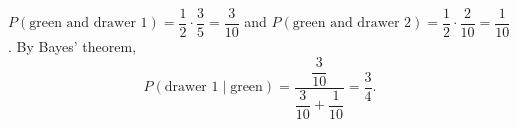 $P(\text{green and drawer 1})=\dfrac12\cdot\dfrac35=\dfrac3{10}$ and $P(\text{green and drawer 2})=\dfrac12\cdot\dfrac2{10}=\dfrac1{10}$. By Bayes' theorem,
\[P(\text{drawer 1}\mid\text{green})=\dfrac{\dfrac3{10}}{\dfrac3{10}+\dfrac1{10}}=\boxed{\dfrac34}.\]
